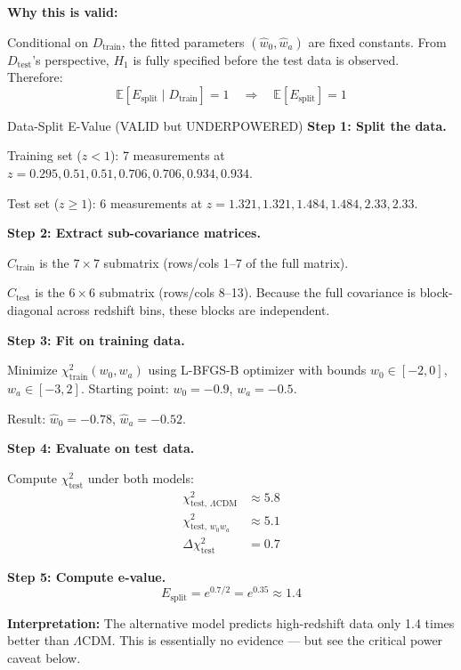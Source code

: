 \documentclass[11pt,a4paper]{article}
\newcommand{\E}{\mathbb{E}}
\newcommand{\LCDM}{$\Lambda$CDM}
\begin{document}
\textbf{Why this is valid:}

Conditional on $D_{\text{train}}$, the fitted parameters $(\hat{w}_0, \hat{w}_a)$ are fixed constants. From $D_{\text{test}}$'s perspective, $H_1$ is fully specified before the test data is observed. Therefore:
\begin{equation}
\E[E_{\text{split}} \mid D_{\text{train}}] = 1 \quad \Rightarrow \quad \E[E_{\text{split}}] = 1
\end{equation}

\begin{examplebox}{Data-Split E-Value (VALID but UNDERPOWERED)}
\textbf{Step 1: Split the data.}

Training set ($z < 1$): 7 measurements at $z = 0.295, 0.51, 0.51, 0.706, 0.706, 0.934, 0.934$.

Test set ($z \geq 1$): 6 measurements at $z = 1.321, 1.321, 1.484, 1.484, 2.33, 2.33$.

\textbf{Step 2: Extract sub-covariance matrices.}

$C_{\text{train}}$ is the $7\times7$ submatrix (rows/cols 1--7 of the full matrix).

$C_{\text{test}}$ is the $6\times6$ submatrix (rows/cols 8--13). Because the full covariance is block-diagonal across redshift bins, these blocks are independent.

\textbf{Step 3: Fit on training data.}

Minimize $\chi^2_{\text{train}}(w_0, w_a)$ using L-BFGS-B optimizer with bounds $w_0 \in [-2, 0]$, $w_a \in [-3, 2]$. Starting point: $w_0 = -0.9$, $w_a = -0.5$.

Result: $\hat{w}_0 = -0.78$, $\hat{w}_a = -0.52$.

\textbf{Step 4: Evaluate on test data.}

Compute $\chi^2_{\text{test}}$ under both models:
\begin{align}
\chi^2_{\text{test, \LCDM}} &\approx 5.8 \\
\chi^2_{\text{test, }w_0w_a} &\approx 5.1 \\
\Delta\chi^2_{\text{test}} &= 0.7
\end{align}

\textbf{Step 5: Compute e-value.}
\begin{equation}
E_{\text{split}} = e^{0.7/2} = e^{0.35} \approx 1.4
\end{equation}

\textbf{Interpretation:} The alternative model predicts high-redshift data only 1.4 times better than \LCDM{}. This is essentially no evidence --- but see the critical power caveat below.
\end{examplebox}
\end{document}
